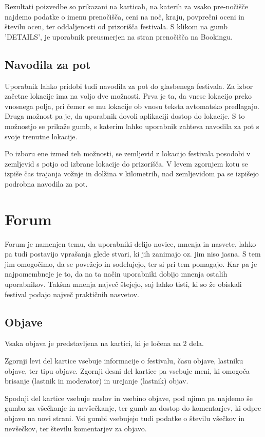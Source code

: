\documentclass[a4paper,12pt,openright]{book}
\begin{document}
Rezultati poizvedbe so prikazani na karticah, na katerih za vsako pre-nočišče najdemo podatke o imenu prenočišča, ceni na noč, kraju, povprečni oceni in številu ocen, ter oddaljenosti od prizorišča festivala.
S klikom na gumb 'DETAILS', je uporabnik preusmerjen na stran prenočišča na Bookingu.

\subsection{Navodila za pot}
Uporabnik lahko pridobi tudi navodila za pot do glasbenega festivala.
Za izbor začetne lokacije ima na voljo dve možnosti.
Prva je ta, da vnese lokacijo preko vnosnega polja, pri čemer se mu lokacije ob vnosu teksta avtomatsko predlagajo.
Druga možnost pa je, da uporabnik dovoli aplikaciji dostop do lokacije.
S to možnostjo se prikaže gumb, s katerim lahko uporabnik zahteva navodila za pot s svoje trenutne lokacije.

Po izboru ene izmed teh možnosti, se zemljevid z lokacijo festivala posodobi v zemljevid s potjo od izbrane lokacije do prizorišča.
V levem zgornjem kotu se izpiše čas trajanja vožnje in dolžina v kilometrih, nad zemljevidom pa se izpišejo podrobna navodila za pot.

\section{Forum}
Forum je namenjen temu, da uporabniki delijo novice, mnenja in nasvete, lahko pa tudi postavijo vprašanja glede stvari, ki jih zanimajo oz. jim niso jasna.
S tem jim omogočimo, da se povežejo in sodelujejo, ter si pri tem pomagajo.
Kar pa je najpomembneje je to, da na ta način uporabniki dobijo mnenja ostalih uporabnikov.
Takšna mnenja največ štejejo, saj lahko tisti, ki so že obiskali festival podajo največ praktičnih nasvetov.

\subsection{Objave}
Vsaka objava je predstavljena na kartici, ki je ločena na 2 dela.

Zgornji levi del kartice vsebuje informacije o festivalu, času objave, lastniku objave, ter tipu objave.
Zgornji desni del kartice pa vsebuje meni, ki omogoča brisanje (lastnik in moderator) in urejanje (lastnik) objav.

Spodnji del kartice vsebuje naslov in vsebino objave, pod njima pa najdemo še gumba za všečkanje in nevšečkanje, ter gumb za dostop do komentarjev, ki odpre objavo na novi strani.
Vsi gumbi vsebujejo tudi podatke o številu všečkov in nevšečkov, ter številu komentarjev za objavo.
\end{document}
